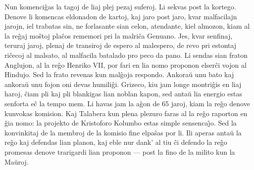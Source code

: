    Nun komenci\^gas la tagoj de liaj plej pezaj suferoj. Li sekvas post
la kortego. Denove li komencas eldonadon de kartoj, kaj jaro post
jaro, kvar malfacilajn jarojn, iel trabatas sin, ne forlasante sian
celon, atendante, kiel almozon, kiam al la re\^gaj mo\^stoj pla\^cos
rememori pri la malri\^ca Genuano. Jes, kvar senfinaj, teruraj
jaroj, plenaj de transiroj de espero al malespero, de revo pri
estontaj ri\^cecoj al malsato, al malfacila batalado pro peco da
pano. Li sendas sian fraton Anglujon, al la re\^go Henriko VII, por
fari en lia nomo proponon elser\^ci vojon al Hindujo. Sed la frato
revenas kun mal\^goja respondo. Ankora\u u unu bato kaj ankora\u u
unu fojon oni devas humili\^gi. Grizeco, kiu jam longe montri\^gis
en liaj haroj, \^ciam pli kaj pli blankigas lian noblan kapon, sed
anta\u u lia energio estas senforta e\^c la tempo mem. Li havas jam
la a\^gon de 65 jaroj, kiam la re\^go denove kunvokas komision. Kaj
Talabera kun plena plezuro faras al la re\^go raporton en \^gia
nomo: la projekto de Kristoforo Kolumbo estas simple
sensenca\^{\j}o. Sed la konvinkitaj de la membroj de la komisio fine
elpa\^sas por li. Ili aperas anta\u u la re\^go kaj defendas lian
planon, kaj eble nur dank' al tiu \^ci defendo la re\^go promesas
denove trarigardi lian proponon --- post la fino de la milito kun la
Ma\u uroj.

